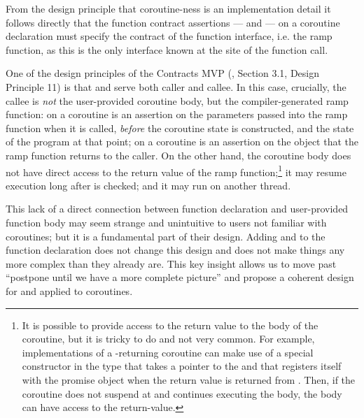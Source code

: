 From the design principle that coroutine-ness is an implementation detail it follows directly that the function contract assertions ---  and  --- on a coroutine declaration must specify the contract of the function interface, i.e. the ramp function, as this is the only interface known at the site of the function call.

One of the design principles of the Contracts MVP (\cite{P2900R8}, Section 3.1, Design Principle 11) is that  and  serve both caller and callee. In this case, crucially, the callee is \emph{not} the user-provided coroutine body, but the compiler-generated ramp function:  on a coroutine is an assertion on the parameters passed into the ramp function when it is called, \emph{before} the coroutine state is constructed, and the state of the program at that point;  on a coroutine is an assertion on the object that the ramp function returns to the caller. On the other hand, the coroutine body does not have direct access to the return value of the ramp function;\footnote{It is possible to provide access to the return value to the body of the coroutine, but it is tricky to do and not very common. For example, implementations of a -returning coroutine can make use of a special constructor in the  type that takes a pointer to the  and that registers itself with the promise object when the return value is returned from . Then, if the coroutine does not suspend at  and continues executing the body, the body can have access to the return-value.} it may resume execution long after  is checked; and it may run on another thread.

This lack of a direct connection between function declaration and user-provided function body may seem strange and unintuitive to users not familiar with coroutines; but it is a fundamental part of their design. Adding  and  to the function declaration does not change this design and does not make things any more complex than they already are. This key insight allows us to move past ``postpone until we have a more complete picture'' and propose a coherent design for  and  applied to coroutines.

